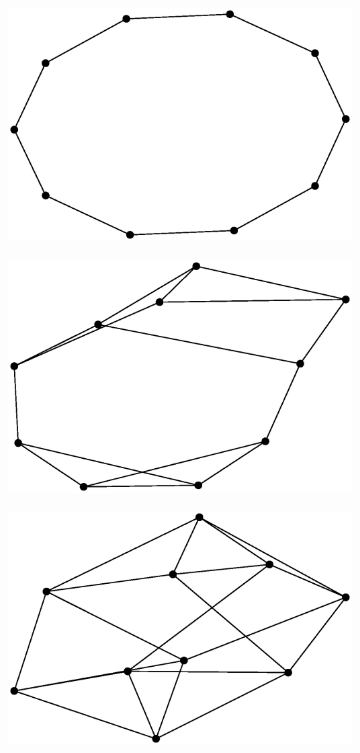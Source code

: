 \begin{figure}[h!]
     \centering
     \begin{subfigure}[b]{0.29\textwidth}
         \includegraphics[width=\columnwidth]{images/rrges-1.eps}
     \end{subfigure}
     \hspace{0em}
     \begin{subfigure}[b]{0.29\textwidth}
         \includegraphics[width=\columnwidth]{images/rrges0.eps}
     \end{subfigure}
     \hspace{0em}
     \begin{subfigure}[b]{0.29\textwidth}
         \includegraphics[width=\columnwidth]{images/rrges1.eps}

\end{subfigure}
\end{figure}
